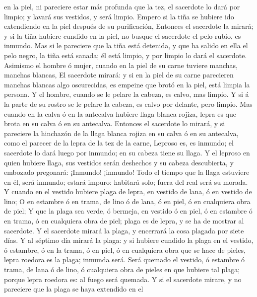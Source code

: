 en la piel, ni pareciere estar más profunda que la tez, el sacerdote lo
dará por limpio; y lavará sus vestidos, y será limpio. 
Empero si la tiña se hubiere ido extendiendo en la piel después de su
purificación,  Entonces el sacerdote la mirará; y si la
tiña hubiere cundido en la piel, no busque el sacerdote el pelo rubio,
es inmundo.  Mas si le pareciere que la tiña está detenida,
y que ha salido en ella el pelo negro, la tiña está sanada; él está
limpio, y por limpio lo dará el sacerdote.  Asimismo el
hombre ó mujer, cuando en la piel de su carne tuviere manchas, manchas
blancas,  El sacerdote mirará: y si en la piel de su carne
parecieren manchas blancas algo oscurecidas, es empeine que brotó en la
piel, está limpia la persona.  Y el hombre, cuando se le
pelare la cabeza, es calvo, mas limpio.  Y si á la parte de
su rostro se le pelare la cabeza, es calvo por delante, pero limpio.
 Mas cuando en la calva ó en la antecalva hubiere llaga
blanca rojiza, lepra es que brota en su calva ó en su antecalva.
 Entonces el sacerdote lo mirará, y si pareciere la
hinchazón de la llaga blanca rojiza en su calva ó en su antecalva, como
el parecer de la lepra de la tez de la carne,  Leproso es,
es inmundo; el sacerdote lo dará luego por inmundo; en su cabeza tiene
su llaga.  Y el leproso en quien hubiere llaga, sus
vestidos serán deshechos y su cabeza descubierta, y embozado pregonará:
¡Inmundo! ¡inmundo!  Todo el tiempo que la llaga estuviere
en él, será inmundo; estará impuro: habitará solo; fuera del real será
su morada.  Y cuando en el vestido hubiere plaga de lepra,
en vestido de lana, ó en vestido de lino;  O en estambre ó
en trama, de lino ó de lana, ó en piel, ó en cualquiera obra de piel;
 Y que la plaga sea verde, ó bermeja, en vestido ó en piel,
ó en estambre ó en trama, ó en cualquiera obra de piel; plaga es de
lepra, y se ha de mostrar al sacerdote.  Y el sacerdote
mirará la plaga, y encerrará la cosa plagada por siete días.
 Y al séptimo día mirará la plaga: y si hubiere cundido la
plaga en el vestido, ó estambre, ó en la trama, ó en piel, ó en
cualquiera obra que se hace de pieles, lepra roedora es la plaga;
inmunda será.  Será quemado el vestido, ó estambre ó trama,
de lana ó de lino, ó cualquiera obra de pieles en que hubiere tal plaga;
porque lepra roedora es: al fuego será quemada.  Y si el
sacerdote mirare, y no pareciere que la plaga se haya extendido en el
